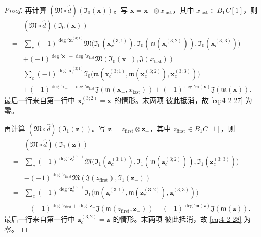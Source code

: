 \begin{proof}
再计算 $(\mathfrak M\circ\widehat d)(\mathfrak I_0(\mathbf x))$。写
$\mathbf x=\mathbf x_-\otimes x_{\mathrm{last}}$，其中
$x_{\mathrm{last}}\in B_1C[1]$，则
{\small
\begin{equation}
\begin{aligned}
&(\mathfrak M\circ\widehat d)(\mathfrak I_0(\mathbf x))\\
={}&\sum_c(-1)^{\deg'\mathbf x_c^{(3;1)}}
 \mathfrak M\bigl(\mathfrak I_0(\mathbf x_c^{(3;1)}),
  \mathfrak I_0(\mathfrak m(\mathbf x_c^{(3;2)})),
  \mathfrak I_0(\mathbf x_c^{(3;3)})\bigr)\\
&+(-1)^{\deg'\mathbf x_-+\deg'x_{\mathrm{last}}}
 \mathfrak M(\mathfrak I_0(\mathbf x_-),\mathfrak J(x_{\mathrm{last}}))\\
={}&\sum_c(-1)^{\deg'\mathbf x_c^{(3;1)}}
 \mathfrak I_0\bigl(\mathfrak m(\mathbf x_c^{(3;1)},
  \mathfrak m(\mathbf x_c^{(3;2)}),\mathbf x_c^{(3;3)})\bigr)\\
&+(-1)^{\deg'\mathbf x_-+\deg'x_{\mathrm{last}}}
 \mathfrak J(\mathfrak m(\mathbf x_-,x_{\mathrm{last}}))
 +(-1)^{\deg'\mathfrak m(\mathbf x)}
 \mathfrak J(\mathfrak m(\mathbf x)).
\end{aligned}
\tag{4.2.27}\label{eq:4-2-27}
\end{equation}
}
最后一行来自第一行中 $\mathbf x_c^{(3;2)}=\mathbf x$ 的情形。末两项
彼此抵消，故 \eqref{eq:4-2-27} 为零。

再计算 $(\mathfrak M\circ\widehat d)(\mathfrak I_1(\mathbf z))$。写
$\mathbf z=z_{\mathrm{first}}\otimes\mathbf z_-$，其中
$z_{\mathrm{first}}\in B_1C[1]$，则
{\small
\begin{equation}
\begin{aligned}
&(\mathfrak M\circ\widehat d)(\mathfrak I_1(\mathbf z))\\
={}&\sum_c(-1)^{\deg'\mathbf z_c^{(3;1)}}
 \mathfrak M\bigl(\mathfrak I_1(\mathbf z_c^{(3;1)}),
  \mathfrak I_1(\mathfrak m(\mathbf z_c^{(3;2)})),
  \mathfrak I_1(\mathbf z_c^{(3;3)})\bigr)\\
&-(-1)^{\deg'z_{\mathrm{first}}}
 \mathfrak M(\mathfrak J(z_{\mathrm{first}}),\mathfrak I_1(\mathbf z_-))\\
={}&\sum_c(-1)^{\deg'\mathbf z_c^{(3;1)}}
 \mathfrak I_1\bigl(\mathfrak m(\mathbf z_c^{(3;1)},
  \mathfrak m(\mathbf z_c^{(3;2)}),\mathbf z_c^{(3;3)})\bigr)\\
&-(-1)^{\deg'z_{\mathrm{first}}+\deg'\mathbf z_-}
 \mathfrak J(\mathfrak m(z_{\mathrm{first}},\mathbf z_-))
 -(-1)^{\deg'\mathfrak m(\mathbf z)}
 \mathfrak J(\mathfrak m(\mathbf z)).
\end{aligned}
\tag{4.2.28}\label{eq:4-2-28}
\end{equation}
}
最后一行来自第一行中 $\mathbf z_c^{(3;2)}=\mathbf z$ 的情形。末两项
彼此抵消，故 \eqref{eq:4-2-28} 为零。


\end{proof}
